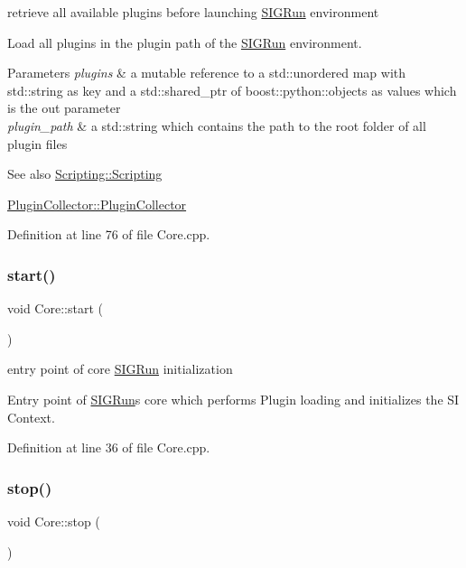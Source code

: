 retrieve all available plugins before launching \mbox{\hyperlink{class_s_i_g_run}{S\+I\+G\+Run}} environment 

Load all plugins in the plugin path of the \mbox{\hyperlink{class_s_i_g_run}{S\+I\+G\+Run}} environment.


\begin{DoxyParams}{Parameters}
{\em plugins} & a mutable reference to a std\+::unordered map with std\+::string as key and a std\+::shared\+\_\+ptr of boost\+::python\+::objects as values which is the out parameter \\
\hline
{\em plugin\+\_\+path} & a std\+::string which contains the path to the root folder of all plugin files\\
\hline
\end{DoxyParams}
\begin{DoxySeeAlso}{See also}
\mbox{\hyperlink{class_scripting_ab978243f5f2fd597651d6c4c28cb83ca}{Scripting\+::\+Scripting}} 

\mbox{\hyperlink{class_plugin_collector_a53aeef5e9d4d5c31903532f879b205d1}{Plugin\+Collector\+::\+Plugin\+Collector}} 
\end{DoxySeeAlso}


Definition at line 76 of file Core.\+cpp.

\mbox{\label{class_core_a0e1d6754f6c2cabd2cd2862d541fe127}} 
\subsubsection{\texorpdfstring{start()}{start()}}
{\footnotesize\ttfamily void Core\+::start (\begin{DoxyParamCaption}{ }\end{DoxyParamCaption})}



entry point of core \mbox{\hyperlink{class_s_i_g_run}{S\+I\+G\+Run}} initialization 

Entry point of \mbox{\hyperlink{class_s_i_g_run}{S\+I\+G\+Run}}\textquotesingle{}s core which performs Plugin loading and initializes the SI Context. 

Definition at line 36 of file Core.\+cpp.

\mbox{\label{class_core_a034f9e2fcfea6cad68318a938fb0c926}} 
\subsubsection{\texorpdfstring{stop()}{stop()}}
{\footnotesize\ttfamily void Core\+::stop (\begin{DoxyParamCaption}{ }\end{DoxyParamCaption})}



